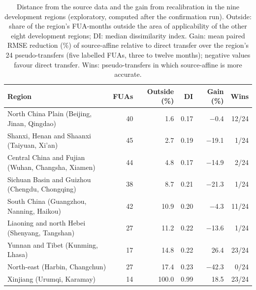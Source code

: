 \begin{table}[H]
\centering
\footnotesize
\caption{Distance from the source data and the gain from recalibration in the nine development regions (exploratory, computed after the confirmation run). Outside: share of the region's FUA-months outside the area of applicability of the other eight development regions; DI: median dissimilarity index. Gain: mean paired RMSE reduction (\%) of source-affine relative to direct transfer over the region's 24 pseudo-transfers (five labelled FUAs, three to twelve months); negative values favour direct transfer. Wins: pseudo-transfers in which source-affine is more accurate.}
\label{tab:adapt-distance}
\setlength{\tabcolsep}{4pt}
\begin{tabular}{@{}lrrrrr@{}}
\toprule
Region & FUAs & Outside (\%) & DI & Gain (\%) & Wins \\
\midrule
North China Plain (Beijing, Jinan, Qingdao) & 40 & 1.6 & 0.17 & $-$0.4 & 12/24 \\
Shanxi, Henan and Shaanxi (Taiyuan, Xi'an) & 45 & 2.7 & 0.19 & $-$19.1 & 1/24 \\
Central China and Fujian (Wuhan, Changsha, Xiamen) & 44 & 4.8 & 0.17 & $-$14.9 & 2/24 \\
Sichuan Basin and Guizhou (Chengdu, Chongqing) & 38 & 8.7 & 0.21 & $-$21.3 & 1/24 \\
South China (Guangzhou, Nanning, Haikou) & 42 & 10.9 & 0.20 & $-$4.3 & 11/24 \\
Liaoning and north Hebei (Shenyang, Tangshan) & 27 & 11.2 & 0.22 & $-$13.6 & 1/24 \\
Yunnan and Tibet (Kunming, Lhasa) & 17 & 14.8 & 0.22 & 26.4 & 23/24 \\
North-east (Harbin, Changchun) & 27 & 17.4 & 0.23 & $-$42.3 & 0/24 \\
Xinjiang (Urumqi, Karamay) & 14 & 100.0 & 0.99 & 18.5 & 23/24 \\
\bottomrule
\end{tabular}
\end{table}
